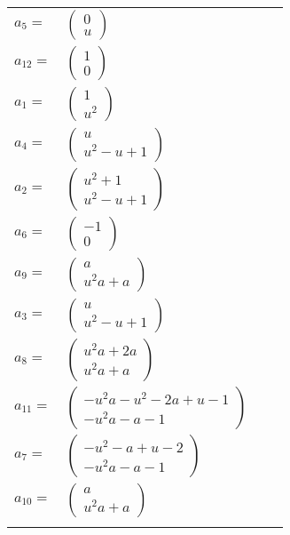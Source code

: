 \documentclass[1p]{elsarticle_modified}
\theoremstyle{definition}
\begin{document}
\begin{tabular}{m{7pt} m{180pt} m{7pt} m{180pt} }
\flushright $a_{5}=$&$\begin{pmatrix}0\\u\end{pmatrix}$ \\
\flushright $a_{12}=$&$\begin{pmatrix}1\\0\end{pmatrix}$ \\
\flushright $a_{1}=$&$\begin{pmatrix}1\\u^2\end{pmatrix}$ \\
\flushright $a_{4}=$&$\begin{pmatrix}u\\u^2- u+1\end{pmatrix}$ \\
\flushright $a_{2}=$&$\begin{pmatrix}u^2+1\\u^2- u+1\end{pmatrix}$ \\
\flushright $a_{6}=$&$\begin{pmatrix}-1\\0\end{pmatrix}$ \\
\flushright $a_{9}=$&$\begin{pmatrix}a\\u^2 a+a\end{pmatrix}$ \\
\flushright $a_{3}=$&$\begin{pmatrix}u\\u^2- u+1\end{pmatrix}$ \\
\flushright $a_{8}=$&$\begin{pmatrix}u^2 a+2 a\\u^2 a+a\end{pmatrix}$ \\
\flushright $a_{11}=$&$\begin{pmatrix}- u^2 a- u^2-2 a+u-1\\- u^2 a- a-1\end{pmatrix}$ \\
\flushright $a_{7}=$&$\begin{pmatrix}- u^2- a+u-2\\- u^2 a- a-1\end{pmatrix}$ \\
\flushright $a_{10}=$&$\begin{pmatrix}a\\u^2 a+a\end{pmatrix}$\\&\end{tabular}
\end{document}
